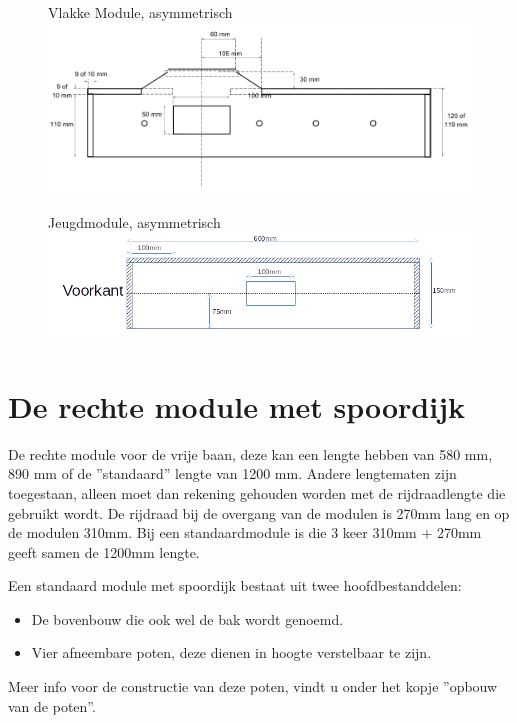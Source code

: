 \documentclass[12pt,a4paper]{report}
\begin{document}
\begin{figure}[ht]
  \captionbox
  {Vlakke Module, asymmetrisch}
  {\includegraphics[scale=0.25]{images/rcu_vlak_asym}}
\end{figure}

\begin{figure}[!ht]
  \captionbox
  {Jeugdmodule, asymmetrisch\label{im:jeugdbak}}
  {\includegraphics[scale=0.9]{images/jeugdbak}}
\end{figure}

\section{De rechte module met spoordijk}
De rechte module voor de vrije baan, deze kan een lengte hebben van 580 mm, 890 mm of de ''standaard'' lengte van 1200 mm.
Andere lengtematen zijn toegestaan, alleen moet dan rekening gehouden worden met de rijdraadlengte die gebruikt wordt. De rijdraad bij de overgang van de modulen is 270mm lang en op de modulen 310mm.
Bij een standaardmodule is die 3 keer 310mm + 270mm geeft samen de 1200mm lengte.

Een standaard module met spoordijk bestaat uit twee hoofdbestanddelen:
\begin{itemize}
\item De bovenbouw die ook wel de bak wordt genoemd.
\item Vier afneembare poten, deze dienen in hoogte verstelbaar te zijn.
\end{itemize}
Meer info voor de constructie van deze poten, vindt u onder het kopje ''opbouw van de poten''.
\end{document}
